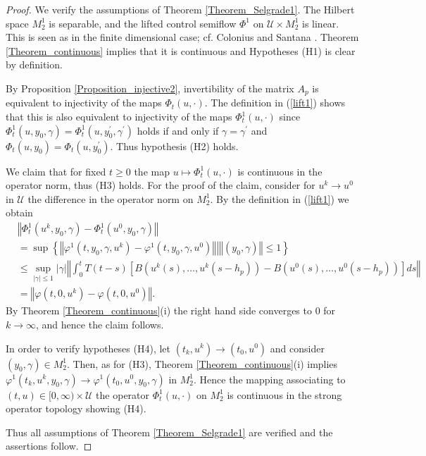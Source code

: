 \documentclass{siamltex}%
\begin{document}
\begin{proof}
We verify the assumptions of Theorem \ref{Theorem_Selgrade1}. The Hilbert
space $M_{2}^{1}$ is separable, and the lifted control semiflow $\Phi^{1}$ on
$\mathcal{U}\times M_{2}^{1}$ is linear. This is seen as in the finite
dimensional case; cf. Colonius and Santana \cite{ColS24}. Theorem
\ref{Theorem_continuous} implies that it is continuous and Hypotheses (H1) is
clear by definition.

By Proposition \ref{Proposition_injective2}, invertibility of the matrix
$A_{p}$ is equivalent to injectivity of the maps $\Phi_{t}(u,\cdot)$. The
definition in (\ref{lift1}) shows that this is also equivalent to injectivity
of the maps $\Phi_{t}^{1}(u,\cdot)$ since $\Phi_{t}^{1}(u,y_{0},\gamma
)=\Phi_{t}^{1}(u,y_{0}^{\prime},\gamma^{\prime})$ holds if and only if
$\gamma=\gamma^{\prime}$ and $\Phi_{t}(u,y_{0})=\Phi_{t}(u,y_{0}^{\prime})$.
Thus hypothesis (H2) holds.

We claim that for fixed $t\geq0$ the map $u\mapsto\Phi_{t}^{1}(u,\cdot)$ is
continuous in the operator norm, thus (H3) holds. For the proof of the claim,
consider for $u^{k}\rightarrow u^{0}$ in $\mathcal{U}$ the difference in the
operator norm on $M_{2}^{1}$. By the definition in (\ref{lift1}) we obtain%
\begin{align*}
&  \left\Vert \Phi_{t}^{1}(u^{k},y_{0},\gamma)-\Phi_{t}^{1}(u^{0},y_{0}%
,\gamma)\right\Vert \\
&  =\sup\left\{  \left\Vert \varphi^{1}(t,y_{0},\gamma,u^{k})-\varphi
^{1}(t,y_{0},\gamma,u^{0})\right\Vert \left\vert \left\Vert (y_{0}%
,\gamma)\right\Vert \leq1\right.  \right\} \\
&  \leq\sup_{\left\vert \gamma\right\vert \leq1}\left\vert \gamma\right\vert
\left\Vert \int_{0}^{t}T(t-s)[B\left(  u^{k}(s),\ldots,u^{k}(s-h_{p})\right)
-B\left(  u^{0}(s),\ldots,u^{0}(s-h_{p})\right)  ]ds\right\Vert \\
&  =\left\Vert \varphi(t,0,u^{k})-\varphi(t,0,u^{0})\right\Vert .
\end{align*}
By Theorem \ref{Theorem_continuous}(i) the right hand side converges to $0$
for $k\rightarrow\infty$, and hence the claim follows.

In order to verify hypotheses (H4), let $(t_{k},u^{k})\rightarrow(t_{0}%
,u^{0})$ and consider $(y_{0},\gamma)\in M_{2}^{1}$. Then, as for (H3),
Theorem \ref{Theorem_continuous}(i) implies $\varphi^{1}(t_{k},u^{k}%
,y_{0},\gamma)\rightarrow\varphi^{1}(t_{0},u^{0},y_{0},\gamma)$ in $M_{2}^{1}%
$. Hence the mapping associating to $(t,u)\in\lbrack0,\infty)\times
\mathcal{U}$ the operator $\Phi_{t}^{1}(u,\cdot)$ on $M_{2}^{1}$ is continuous
in the strong operator topology showing (H4).

Thus all assumptions of Theorem \ref{Theorem_Selgrade1} are verified and the
assertions follow.
\end{proof}
\end{document}
